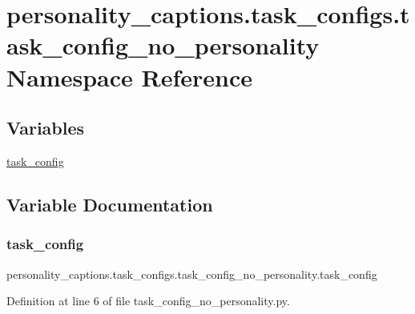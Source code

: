 \hypertarget{namespacepersonality__captions_1_1task__configs_1_1task__config__no__personality}{}\section{personality\+\_\+captions.\+task\+\_\+configs.\+task\+\_\+config\+\_\+no\+\_\+personality Namespace Reference}
\label{namespacepersonality__captions_1_1task__configs_1_1task__config__no__personality}
\subsection*{Variables}
\begin{DoxyCompactItemize}
\item 
\hyperlink{namespacepersonality__captions_1_1task__configs_1_1task__config__no__personality_af9ab661855b3f4aae3d77c8dc0894ffe}{task\+\_\+config}
\end{DoxyCompactItemize}


\subsection{Variable Documentation}
\mbox{\label{namespacepersonality__captions_1_1task__configs_1_1task__config__no__personality_af9ab661855b3f4aae3d77c8dc0894ffe}} 
\subsubsection{\texorpdfstring{task\+\_\+config}{task\_config}}
{\footnotesize\ttfamily personality\+\_\+captions.\+task\+\_\+configs.\+task\+\_\+config\+\_\+no\+\_\+personality.\+task\+\_\+config}



Definition at line 6 of file task\+\_\+config\+\_\+no\+\_\+personality.\+py.

